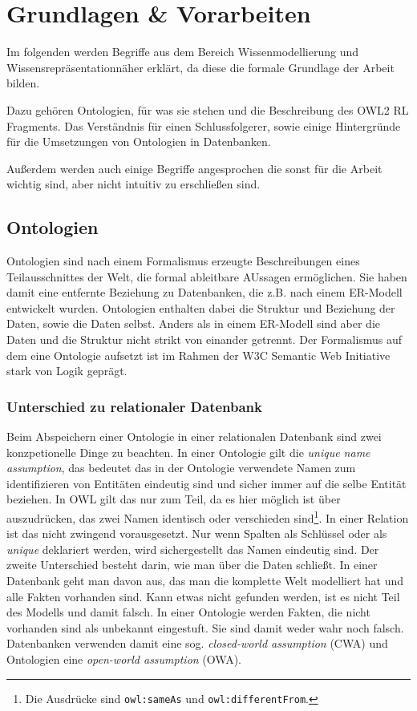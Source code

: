 \chapter{Grundlagen \& Vorarbeiten}
\label{kapitel-grundlagen}
Im folgenden werden Begriffe aus dem Bereich Wissenmodellierung und Wissensrepräsentationnäher erklärt, da diese die formale Grundlage der Arbeit bilden.

Dazu gehören Ontologien, für was sie stehen und die Beschreibung des OWL2 RL Fragments. Das Verständnis für einen Schlussfolgerer, sowie einige Hintergründe für die Umsetzungen von Ontologien in Datenbanken.

Außerdem werden auch einige Begriffe angesprochen die sonst für die Arbeit wichtig sind, aber nicht intuitiv zu erschließen sind.

\section{Ontologien}

Ontologien sind nach einem Formalismus erzeugte Beschreibungen eines Teilausschnittes der Welt, die formal ableitbare AUssagen ermöglichen. Sie haben damit eine entfernte Beziehung zu Datenbanken, die z.B. nach einem ER-Modell entwickelt wurden. Ontologien enthalten dabei die Struktur und Beziehung der Daten, sowie die Daten selbst. Anders als in einem ER-Modell sind aber die Daten und die Struktur nicht strikt von einander getrennt. Der Formalismus auf dem eine Ontologie aufsetzt ist im Rahmen der W3C Semantic Web Initiative stark von Logik geprägt. \cite{Hesse2002}

\subsection{Unterschied zu relationaler Datenbank}

Beim Abspeichern einer Ontologie in einer relationalen Datenbank sind zwei konzpetionelle Dinge zu beachten. In einer Ontologie gilt die \emph{unique name assumption}, das bedeutet das in der Ontologie verwendete Namen zum identifizieren von Entitäten eindeutig sind und sicher immer auf die selbe Entität beziehen. In OWL gilt das nur zum Teil, da es hier möglich ist über auszudrücken, das zwei Namen identisch oder verschieden sind\cite{OWL1}\footnote{Die Ausdrücke sind \texttt{owl:sameAs} und \texttt{owl:differentFrom}.}. In einer Relation ist das nicht zwingend vorausgesetzt. Nur wenn Spalten als Schlüssel oder als \emph{unique} deklariert werden, wird sichergestellt das Namen eindeutig sind.
Der zweite Unterschied besteht darin, wie man über die Daten schließt. In einer Datenbank geht man davon aus, das man die komplette Welt modelliert hat und alle Fakten vorhanden sind. Kann etwas nicht gefunden werden, ist es nicht Teil des Modells und damit falsch. In einer Ontologie werden Fakten, die nicht vorhanden sind als unbekannt eingestuft. Sie sind damit weder wahr noch falsch. Datenbanken verwenden damit eine sog. \emph{closed-world assumption} (CWA) und Ontologien eine \emph{open-world assumption} (OWA).

